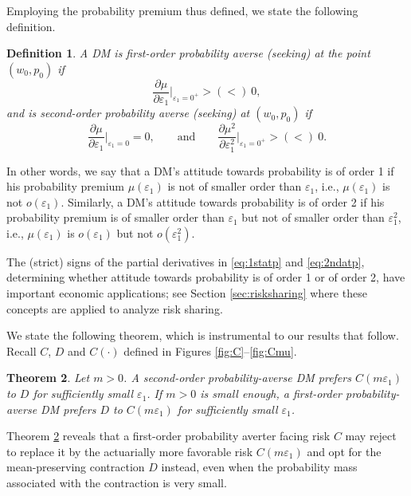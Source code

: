 \documentclass[11pt]{article}
\newtheorem{theorem}{Theorem}[section]
\newtheorem{definition}[theorem]{Definition}
\begin{document}
Employing the probability premium thus defined, we state the following definition.

\begin{definition}
A DM is first-order probability averse (seeking) at the point $(w_{0},p_{0})$ if
\begin{equation}
\frac{\partial \mu}{\partial \varepsilon_{1}}\Big|_{\varepsilon_{1}=0^{+}}>(<)\ 0,
\label{eq:1statp}
\end{equation}
and is second-order probability averse (seeking) at $(w_{0},p_{0})$ if
\begin{equation}
\frac{\partial \mu}{\partial \varepsilon_{1}}\Big|_{\varepsilon_{1}=0}=0,\qquad\mathrm{and}\qquad
\frac{\partial \mu^{2}}{\partial \varepsilon_{1}^{2}}\Big|_{\varepsilon_{1}=0^{+}}>(<)\ 0.
\label{eq:2ndatp}
\end{equation}
\end{definition}

In other words, we say that a DM's attitude towards probability is of order 1
if his probability premium $\mu(\varepsilon_{1})$ is not of smaller order than $\varepsilon_{1}$,
i.e., $\mu(\varepsilon_{1})$ is not $o(\varepsilon_{1})$.
Similarly, a DM's attitude towards probability is of order 2
if his probability premium is of smaller order than $\varepsilon_{1}$ but not of smaller order than $\varepsilon_{1}^{2}$,
i.e., $\mu(\varepsilon_{1})$ is $o(\varepsilon_{1})$ but not $o(\varepsilon_{1}^{2})$.

The (strict) signs of the partial derivatives in \eqref{eq:1statp} and \eqref{eq:2ndatp},
determining whether attitude towards probability is of order 1 or of order 2,
have important economic applications;
see Section \ref{sec:risksharing} where these concepts are applied to analyze risk sharing.

We state the following theorem, which is instrumental to our results that follow.
Recall $C$, $D$ and $C(\cdot)$ defined in Figures \ref{fig:C}--\ref{fig:Cmu}.
\begin{theorem}
Let $m>0$.
A second-order probability-averse DM prefers $C(m\varepsilon_{1})$ to $D$
for sufficiently small $\varepsilon_{1}$.
If $m>0$ is small enough, a first-order probability-averse DM prefers $D$ to $C(m\varepsilon_{1})$
for sufficiently small $\varepsilon_{1}$.
\label{th:pa}
\end{theorem}

Theorem \ref{th:pa} reveals that
a first-order probability averter facing risk $C$ may reject to replace it by the actuarially more favorable risk $C(m\varepsilon_{1})$
and opt for the mean-preserving contraction $D$ instead,
even when the probability mass associated with the contraction is very small.
\end{document}
